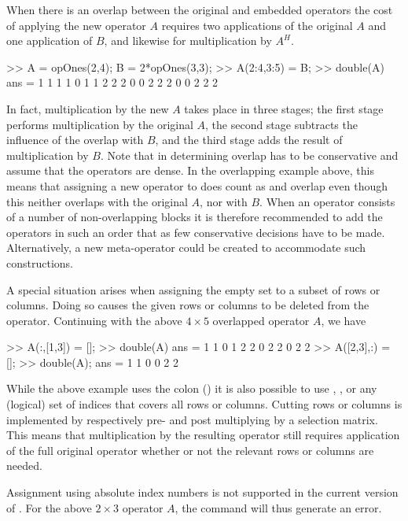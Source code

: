 When there is an overlap between the original and embedded operators
the cost of applying the new operator $A$ requires two applications of
the original $A$ and one application of $B$, and likewise for
multiplication by $A^H$.
\begin{codeblock}
>> A = opOnes(2,4); B = 2*opOnes(3,3);
>> A(2:4,3:5) = B;
>> double(A)
ans =
     1     1     1     1     0
     1     1     2     2     2
     0     0     2     2     2
     0     0     2     2     2
\end{codeblock}
In fact, multiplication by the new $A$ takes place in three stages;
the first stage performs multiplication by the original $A$, the
second stage subtracts the influence of the overlap with $B$, and the
third stage adds the result of multiplication by $B$. Note that in
determining overlap \spot{} has to be conservative and assume that the
operators are dense. In the overlapping example above, this means that
assigning a new operator to  does count as and
overlap even though this neither overlaps with the original $A$, nor
with $B$. When an operator consists of a number of non-overlapping
blocks it is therefore recommended to add the operators in such an
order that as few conservative decisions have to be
made. Alternatively, a new meta-operator could be created to
accommodate such constructions.

A special situation arises when assigning the empty set \mlcmd{[]} to
a subset of rows or columns. Doing so causes the given rows or columns
to be deleted from the operator. Continuing with the above $4\times 5$
overlapped operator $A$, we have
\begin{codeblock}
>> A(:,[1,3]) = [];
>> double(A)
ans =
     1     1     0
     1     2     2
     0     2     2
     0     2     2
>> A([2,3],:) = [];
>> double(A);
ans =
     1     1     0
     0     2     2
\end{codeblock}
While the above example uses the colon (\mlcmd{:}) it is also possible
to use , , or any (logical) set of
indices that covers all rows or columns. Cutting rows or columns is
implemented by respectively pre- and post multiplying by a selection
matrix. This means that multiplication by the resulting operator still
requires application of the full original operator whether or not the
relevant rows or columns are needed.

Assignment using absolute index numbers is not supported in the
current version of \spot{}. For the above $2\times 3$ operator $A$,
the command  will thus generate an error.


